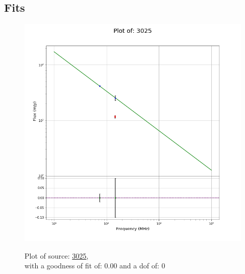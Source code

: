 \documentclass{article}
\begin{document}
\subsection{Fits}
\begin{figure}[H]
    \centering
    \begin{minipage}{.5\textwidth}
        \centering
        \includegraphics[scale = 0.35]{KmeulenTrap4P23_1hr/1hr3025.png}
        \captionsetup{labelformat=empty}
        \caption{Plot of source: \href{http://banana.transientskp.org/r4/vlo_KmeulenTrap4P23/runningcatalog/3025}{3025},\\with a goodness of fit of: 0.00 and a dof of: 0}
        \addtocounter{figure}{-1}
        \label{KmeulenTrap4P23:1hr:3025:plot}
    \end{minipage}%
    \begin{minipage}{0.5\textwidth}
        \centering


\end{minipage}
\end{figure}
\end{document}
